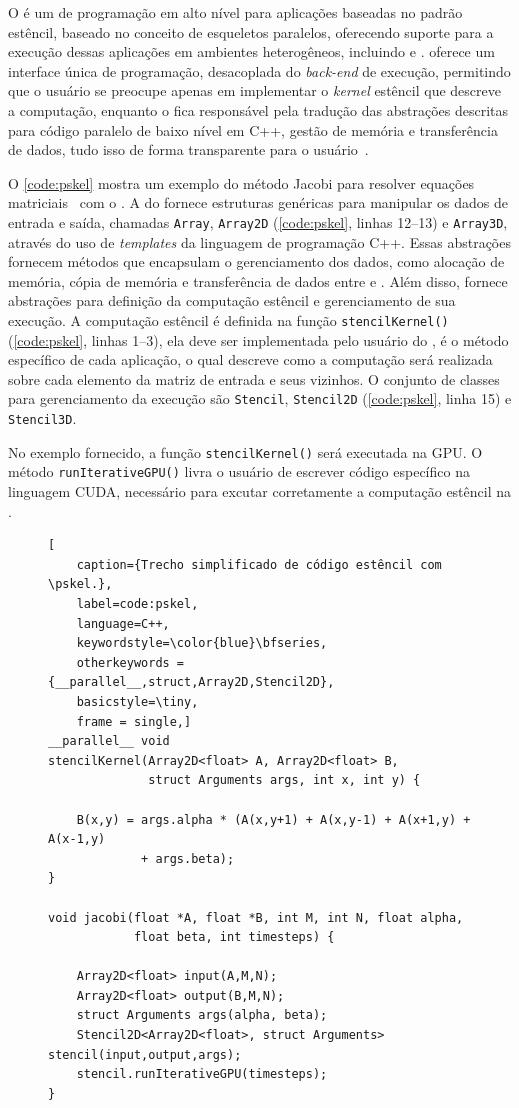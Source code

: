 O \pskel é um \fw de programação em alto nível para aplicações baseadas no
padrão estêncil, baseado no conceito de esqueletos paralelos, oferecendo suporte para a execução dessas aplicações em
ambientes heterogêneos, incluindo \cpu e \gpu. \pskel oferece um interface única de programação, desacoplada do \textit{back-end} de execução, permitindo que o usuário se preocupe apenas em implementar o \textit{kernel} estêncil que descreve a computação, enquanto o \fw fica responsável pela tradução das abstrações descritas para código paralelo de baixo nível em C++, gestão de memória e transferência de dados, tudo isso de forma transparente para o usuário~\cite{CPE:CPE3479}.

O \autoref{code:pskel} mostra um exemplo do método Jacobi para resolver equações matriciais~\cite{demmel97} com o \pskel. A \api do \pskel fornece estruturas genéricas para manipular os dados de entrada e saída, chamadas \texttt{Array}, \texttt{Array2D} (\autoref{code:pskel}, linhas 12--13) e \texttt{Array3D}, através do uso de \textit{templates} da linguagem de programação C++. Essas abstrações fornecem métodos que encapsulam o gerenciamento dos dados, como alocação de memória, cópia de memória e transferência de dados entre \cpu e \gpu. Além disso, fornece abstrações para definição da computação estêncil e gerenciamento de sua execução. A computação estêncil é definida na função \texttt{stencilKernel()} (\autoref{code:pskel}, linhas 1--3), ela deve ser implementada pelo usuário do \pskel, é o método específico de cada aplicação, o qual descreve como a computação será realizada sobre cada elemento da matriz de entrada e seus vizinhos. O conjunto de classes para gerenciamento da execução são \texttt{Stencil}, \texttt{Stencil2D} (\autoref{code:pskel}, linha 15) e \texttt{Stencil3D}.

No exemplo fornecido, a função \texttt{stencilKernel()} será executada na GPU. O método \texttt{runIterativeGPU()} livra o usuário de escrever código específico na linguagem CUDA, necessário para excutar corretamente a computação estêncil na \gpu.

\begin{figure}
\begin{lstlisting}[
    caption={Trecho simplificado de código estêncil com \pskel.}, 
    label=code:pskel,
    language=C++,
    keywordstyle=\color{blue}\bfseries,
    otherkeywords = {__parallel__,struct,Array2D,Stencil2D}, 
    basicstyle=\tiny, 
    frame = single,]
__parallel__ void
stencilKernel(Array2D<float> A, Array2D<float> B, 
              struct Arguments args, int x, int y) {

    B(x,y) = args.alpha * (A(x,y+1) + A(x,y-1) + A(x+1,y) + A(x-1,y) 
             + args.beta);
}
        
void jacobi(float *A, float *B, int M, int N, float alpha, 
            float beta, int timesteps) {

    Array2D<float> input(A,M,N);
    Array2D<float> output(B,M,N);
    struct Arguments args(alpha, beta);
    Stencil2D<Array2D<float>, struct Arguments> stencil(input,output,args);
    stencil.runIterativeGPU(timesteps);
}
\end{lstlisting}
\end{figure}

